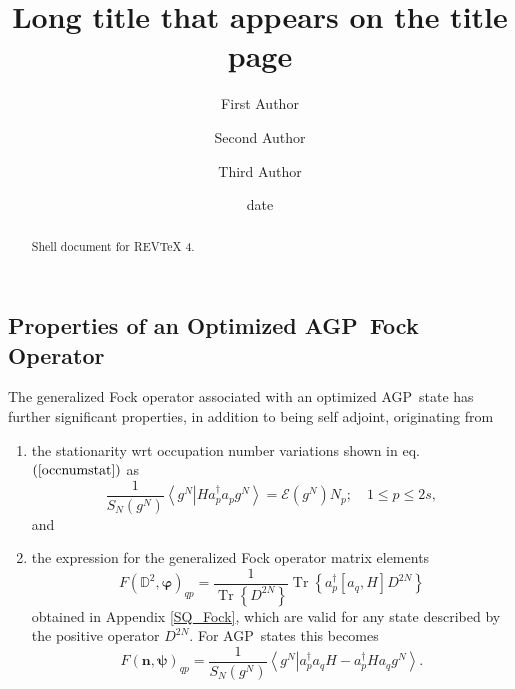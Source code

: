 \documentclass[aps,preprint]{revtex4}%
\begin{document}
\title[Short title for running header]{Long title that appears on the title page}
\author{First Author}
\author{Second Author}
\author{Third Author}

\begin{abstract}
Shell document for REV\TeX{} 4.

\end{abstract}
\date[Date text]{date}




\maketitle
\tableofcontents


\subsection{Properties of an Optimized AGP\ Fock Operator\label{AGP_Fock}}

The generalized Fock operator associated with an optimized AGP\ state has
further significant properties, in addition to being self adjoint, originating from

\begin{enumerate}
\item the stationarity wrt occupation number variations shown in eq. $\left(
\ref{occnumstat}\right)  $ as
\begin{equation}
\frac{1}{S_{N}\left(  g^{N}\right)  }\left\langle \left.  g^{N}\right\vert
Ha_{p}^{\dagger}a_{p}g^{N}\right\rangle =\mathcal{E}\left(  g^{N}\right)
N_{p};\quad1\leq p\leq2s,
\end{equation}
and

\item the expression for the generalized Fock operator matrix elements
\begin{equation}
F\left(  \mathbb{D}^{2},\mathbf{\varphi}\right)  _{qp}=\frac{1}%
{\operatorname{Tr}\left\{  D^{2N}\right\}  }\operatorname{Tr}\left\{
a_{p}^{\dagger}\left[  a_{q},H\right]  D^{2N}\right\}
\end{equation}
obtained in Appendix \ref{SQ_Fock}, which are valid for any state described by
the positive operator $D^{2N}$. For AGP\ states this becomes
\begin{equation}
F\left(  \mathbf{n},\mathbf{\psi}\right)  _{qp}=\frac{1}{S_{N}\left(
g^{N}\right)  }\left\langle \left.  g^{N}\right\vert a_{p}^{\dagger}%
a_{q}H-a_{p}^{\dagger}Ha_{q}g^{N}\right\rangle .
\end{equation}

\end{enumerate}
\end{document}
